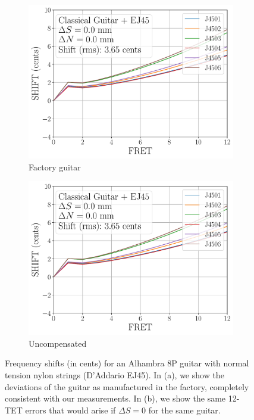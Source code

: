  \begin{figure}
  \centering
  \begin{subfigure}[b]{0.8\textwidth}
   \centering
   \includegraphics[width=5.0in]{../figures/shift_classicalguitar_ej45_factory}
   \caption{Factory guitar}
   \label{fig:shift_classicalguitar_ej45_factory}
  \end{subfigure}
  \par\vspace{0.25in}
  \begin{subfigure}[b]{0.8\textwidth}
   \centering
   \includegraphics[width=5.0in]{../figures/shift_classicalguitar_ej45_null}
   \caption{Uncompensated}
   \label{fig:shift_classicalguitar_ej45_null}
  \end{subfigure}
  \caption{\label{fig:classicalguitar_ej45} Frequency shifts (in cents) for an Alhambra 8P guitar with normal tension nylon strings (D'Addario EJ45). In (a), we show the deviations of the guitar as manufactured in the factory, completely consistent with our measurements. In (b), we show the same 12-TET errors that would arise if $\Delta S = 0$ for the same guitar.}
 \end{figure}

